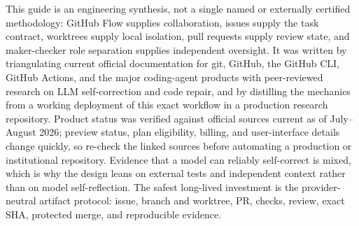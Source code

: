 \documentclass[11pt]{article}
\begin{document}
This guide is an engineering synthesis, not a single named or externally certified methodology:
GitHub Flow supplies collaboration, issues supply the task contract, worktrees supply local
isolation, pull requests supply review state, and maker-checker role separation supplies
independent oversight. It was written by triangulating current official documentation for git,
GitHub, the GitHub CLI, GitHub Actions, and the major coding-agent products with peer-reviewed
research on LLM self-correction and code repair, and by distilling the mechanics from a working
deployment of this exact workflow in a production research repository. Product status was
verified against official sources current as of July--August 2026; preview status, plan
eligibility, billing, and user-interface details change quickly, so re-check the linked sources
before automating a production or institutional repository. Evidence that a model can reliably
self-correct is mixed, which is why the design leans on external tests and independent context
rather than on model self-reflection. The safest long-lived investment is the provider-neutral
artifact protocol: issue, branch and worktree, PR, checks, review, exact SHA, protected merge,
and reproducible evidence.
\end{document}
